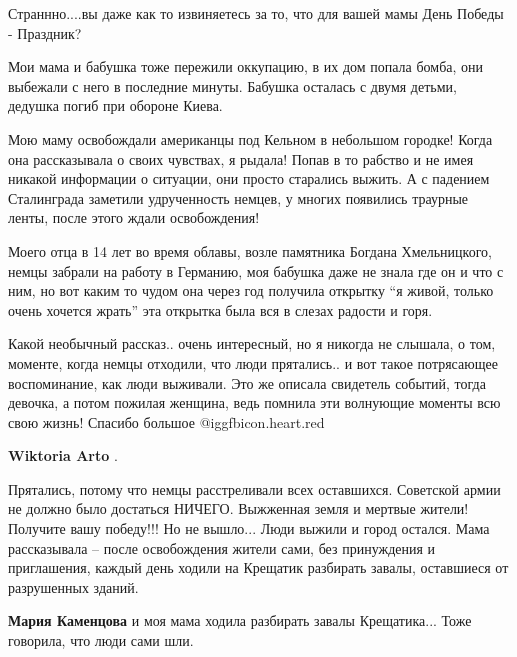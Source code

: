 \begin{itemize}
\begin{itemize}
Страннно....вы даже как то извиняетесь за то, что для вашей мамы День Победы -
Праздник?

\end{itemize} %


Мои мама и бабушка тоже пережили оккупацию, в их дом попала бомба, они выбежали
с него в последние минуты. Бабушка осталась с двумя детьми, дедушка погиб при
обороне Киева.


Мою маму освобождали американцы под Кельном в небольшом городке! Когда она
рассказывала о своих чувствах, я рыдала! Попав в то рабство и не имея никакой
информации о ситуации, они просто старались выжить. А с падением Сталинграда
заметили удрученность немцев, у многих появились траурные ленты, после этого
ждали освобождения!


Моего отца в 14 лет во время облавы, возле памятника Богдана Хмельницкого,
немцы забрали на работу в Германию, моя бабушка даже не знала где он и что с
ним, но вот каким то чудом она через год получила открытку \enquote{я живой, только
очень хочется жрать} эта открытка была вся в слезах радости и горя.


Какой необычный рассказ.. очень интересный, но я никогда не слышала, о том,
моменте, когда немцы отходили, что люди прятались.. и вот такое потрясающее
воспоминание, как люди выживали. Это же описала свидетель событий, тогда
девочка, а потом пожилая женщина, ведь помнила эти волнующие моменты всю свою
жизнь! Спасибо большое @igg{fbicon.heart.red}

\begin{itemize} %
\textbf{Wiktoria Arto} . 

Прятались, потому что немцы расстреливали всех оставшихся. Советской армии не
должно было достаться НИЧЕГО. Выжженная земля и мертвые жители! Получите вашу
победу!!! Но не вышло... Люди выжили и город остался. Мама рассказывала – после
освобождения жители сами, без принуждения и приглашения, каждый день ходили на
Крещатик разбирать завалы, оставшиеся от разрушенных зданий.

\begin{itemize} %
\textbf{Мария Каменцова} и моя мама ходила разбирать завалы Крещатика... Тоже говорила, что люди сами шли.


\end{itemize}
\end{itemize}
\end{itemize}
